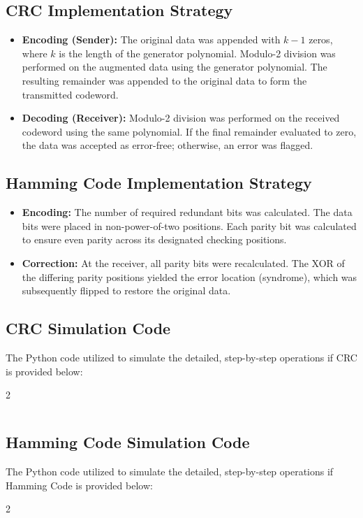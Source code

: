 \documentclass[11pt]{article}
\begin{document}
\subsection{CRC Implementation Strategy}
\begin{itemize}
    \item \textbf{Encoding (Sender):} The original data was appended with $k-1$ zeros, where $k$ is the length of the generator polynomial. Modulo-2 division was performed on the augmented data using the generator polynomial. The resulting remainder was appended to the original data to form the transmitted codeword.
    \item \textbf{Decoding (Receiver):} Modulo-2 division was performed on the received codeword using the same polynomial. If the final remainder evaluated to zero, the data was accepted as error-free; otherwise, an error was flagged.
\end{itemize}

\subsection{Hamming Code Implementation Strategy}
\begin{itemize}
    \item \textbf{Encoding:} The number of required redundant bits was calculated. The data bits were placed in non-power-of-two positions. Each parity bit was calculated to ensure even parity across its designated checking positions.
    \item \textbf{Correction:} At the receiver, all parity bits were recalculated. The XOR of the differing parity positions yielded the error location (syndrome), which was subsequently flipped to restore the original data.
\end{itemize}

\subsection{CRC Simulation Code}
The Python code utilized to simulate the detailed, step-by-step operations if CRC is provided below:
\begin{multicols}{2}
    \inputminted{python3}{./assets/crc_simulation.py}
\end{multicols}

\subsection{Hamming Code Simulation Code}
The Python code utilized to simulate the detailed, step-by-step operations if Hamming Code is provided below:
\begin{multicols}{2}
    \inputminted{python3}{./assets/hamming_simulation.py}
\end{multicols}
\end{document}
